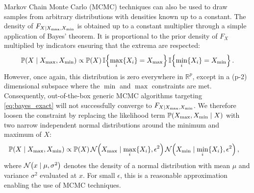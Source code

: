 \documentclass[12pt]{article}
\begin{document}
Markov Chain Monte Carlo (MCMC) techniques can also be used to draw samples from arbitrary distributions with densities known up to a constant. The density of \(F_{X \mid X_{\max},X_{\min}}\) is obtained up to a constant multiplier through a simple application of Bayes' theorem. It is proportional to the prior density of \(F_X\) multiplied by indicators ensuring that the extrema are respected:
\begin{equation}
    \Pr\del{X \mid \Xmax,\Xmin} 
        \propto \Pr\del{X} \Ind\cbr{ \max_i\cbr{X_i} = \Xmax }\Ind\cbr{ \min_i\cbr{X_i} = \Xmin } \,.
\label{eq:bayes_exact}
\end{equation}
However, once again, this distribution is zero everywhere in \(\mathbb{R}^p\), except in a (p-2) dimensional subspace where the \(\min\) and \(\max\) constraints are met.
Consequently, out-of-the-box generic MCMC algorithms targeting \autoref{eq:bayes_exact} will not successfully converge to \(F_{X \mid X_{\max},X_{\min}}\).
We therefore loosen the constraint by replacing the likelihood term \(\Pr\del{\Xmax,\Xmin \mid X}\) with two narrow independent normal distributions around the minimum and maximum of \(X\):
\begin{equation}
\begin{split}
    \Pr\del{X \mid \Xmax,\Xmin} &\propto \Pr\del{X} 
                                         \normal\del{\Xmax \mid \max_i\cbr{X_i}, \epsilon^2}
                                         \normal\del{\Xmin \mid \min_i\cbr{X_i}, \epsilon^2}\,,
\end{split}
\label{eq:normal_lik}
\end{equation}
where \(\normal\del{x \mid \mu, \sigma^2}\) denotes the density of a normal distribution with mean \(\mu\) and variance \(\sigma^2\) evaluated at \(x\).
For small \(\epsilon\), this is a reasonable approximation enabling the use of MCMC techniques.
\end{document}
